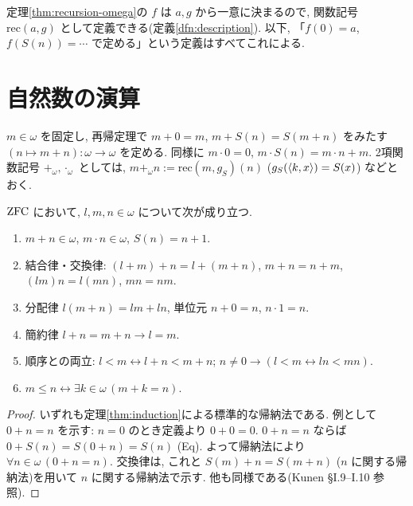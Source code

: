 定理\ref{thm:recursion-omega}の $f$ は $a, g$ から一意に決まるので, 関数記号 $\mathrm{rec}(a, g)$ として定義できる(定義\ref{dfn:description}). 以下, 「$f(0) = a$, $f(S(n)) = \cdots$ で定める」という定義はすべてこれによる.

\section{自然数の演算}

\begin{dfn}
  $m \in \omega$ を固定し, 再帰定理で $m + 0 = m$, $m + S(n) = S(m + n)$ をみたす $(n \mapsto m + n) : \omega \to \omega$ を定める. 同様に $m \cdot 0 = 0$, $m \cdot S(n) = m \cdot n + m$. 2項関数記号 $+_\omega, \cdot_\omega$ としては, $m+_\omega n := \mathrm{rec}(m, g_S)(n)$ ($g_S(\langle k,x\rangle) = S(x)$) などとおく.
\end{dfn}

\begin{thm}\label{thm:omega-arith}
  $\mathrm{ZFC}$ において, $l, m, n \in \omega$ について次が成り立つ.
  \begin{enumerate}[label=(\arabic*)]
    \item $m + n \in \omega$, $m \cdot n \in \omega$, $S(n) = n + 1$.
    \item 結合律・交換律: $(l+m)+n = l+(m+n)$, $m + n = n + m$, $(lm)n = l(mn)$, $mn = nm$.
    \item 分配律 $l(m+n) = lm + ln$, 単位元 $n + 0 = n$, $n \cdot 1 = n$.
    \item 簡約律 $l + n = m + n \to l = m$.
    \item 順序との両立: $l < m \leftrightarrow l + n < m + n$; $n \neq 0 \to (l < m \leftrightarrow l n < m n)$.
    \item $m \leq n \leftrightarrow \exists k \in \omega\,(m + k = n)$.
  \end{enumerate}
\end{thm}
\begin{proof}
  いずれも定理\ref{thm:induction}による標準的な帰納法である. 例として $0 + n = n$ を示す: $n = 0$ のとき定義より $0 + 0 = 0$. $0 + n = n$ ならば $0 + S(n) = S(0 + n) = S(n)$ (Eq). よって帰納法により $\forall n \in \omega\,(0 + n = n)$. 交換律は, これと $S(m) + n = S(m + n)$ ($n$ に関する帰納法)を用いて $n$ に関する帰納法で示す. 他も同様である(Kunen \cite{kunenFoM} \S I.9--I.10 参照).
\end{proof}
